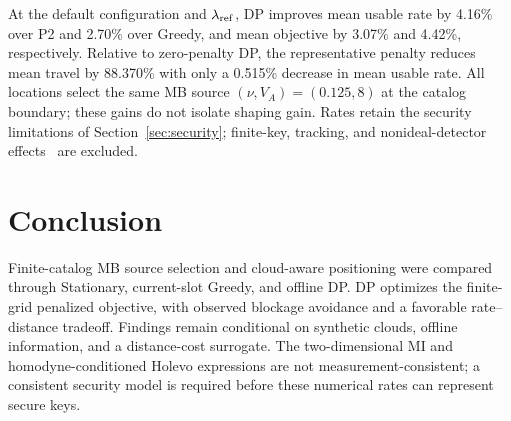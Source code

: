 \documentclass[conference,a4paper]{IEEEtran}
\begin{document}
At the default configuration and $\lambda_{\rm ref}$, DP improves mean
usable rate by 4.16\% over P2 and 2.70\% over Greedy, and mean objective
by 3.07\% and 4.42\%, respectively. Relative to zero-penalty DP, the
representative penalty reduces mean travel by 88.370\% with only a 0.515\%
decrease in mean usable rate. All locations select the same
MB source $(\nu,V_A)=(0.125,8)$ at the catalog boundary; these gains
do not isolate shaping gain. Rates retain the security limitations of
Section~\ref{sec:security}; finite-key, tracking, and nonideal-detector
effects~\cite{usenko2016} are excluded.

\section{Conclusion}
\label{sec:conclusion}
Finite-catalog MB source selection and cloud-aware positioning were
compared through Stationary, current-slot Greedy, and offline DP.
DP optimizes the finite-grid penalized objective, with observed blockage
avoidance and a favorable rate--distance tradeoff. Findings remain
conditional on synthetic clouds, offline information, and a distance-cost
surrogate. The two-dimensional MI and homodyne-conditioned Holevo
expressions are not measurement-consistent; a consistent security model
is required before these numerical rates can represent secure keys.
\end{document}
